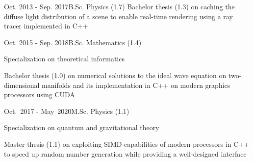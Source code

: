 \documentclass[a4paper,10pt]{cv}
\begin{document}
      \begin{cvTimeItem}{Oct. 2013 - Sep. 2017}{B.Sc. Physics (1.7)}
        Bachelor thesis  (1.3) on caching the diffuse light distribution of a scene to enable real-time rendering using a ray tracer implemented in C++
      \end{cvTimeItem}
      \begin{cvTimeItem}{Oct. 2015 - Sep. 2018}{B.Sc. Mathematics (1.4)}
        \begin{cvItemize}
          \item Specialization on theoretical informatics
          \item Bachelor thesis  (1.0) on numerical solutions to the ideal wave equation on two-dimensional manifolds and its implementation in C++ on modern graphics processors using CUDA
        \end{cvItemize}
      \end{cvTimeItem}
      \begin{cvTimeItem}{Oct.~2017 - May~2020}{M.Sc. Physics (1.1)}
        \begin{cvItemize}
          \item Specialization on quantum and gravitational theory
          \item Master thesis  (1.1) on exploiting SIMD-capabilities of modern processors in C++ to speed up random number generation while providing a well-designed interface
        \end{cvItemize}
      \end{cvTimeItem}
\end{document}
